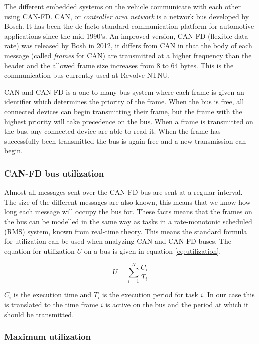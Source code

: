 The different embedded systems on the vehicle communicate with each other using CAN-FD. CAN, or \emph{controller area network} is a network bus developed by Bosch. It has been the de-facto standard communication platform for automotive applications since the mid-1990's. An improved version, CAN-FD (flexible data-rate) was released by Bosh in 2012, it differs from CAN in that the body of each message (called \emph{frames} for CAN) are transmitted at a higher frequency than the header and the allowed frame size increases from 8 to 64 bytes. This is the communication bus currently used at Revolve NTNU.

CAN and CAN-FD is a one-to-many bus system where each frame is given an identifier which determines the priority of the frame. When the bus is free, all connected devices can begin transmitting their frame, but the frame with the highest priority will take precedence on the bus. When a frame is transmitted on the bus, any connected device are able to read it. When the frame has successfully been transmitted the bus is again free and a new transmission can begin.

\subsubsection{CAN-FD bus utilization}

Almost all messages sent over the CAN-FD bus are sent at a regular interval. The size of the different messages are also known, this means that we know how long each message will occupy the bus for. These facts means that the frames on the bus can be modelled in the same way as tasks in a rate-monotonic scheduled (RMS) system, known from real-time theory. This means the standard formula for utilization can be used when analyzing CAN and CAN-FD buses. The equation for utilization $U$ on a bus is given in equation \ref{eq:utilization}. 

\begin{equation}
    U=\sum_{i=1}^N\frac{C_i}{T_i}
    \label{eq:utilization}
\end{equation}

$C_i$ is the execution time and $T_i$ is the execution period for task $i$. In our case this is translated to the time frame $i$ is active on the bus and the period at which it should be transmitted. 


\subsubsection{Maximum utilization} \label{sec:max_util}

